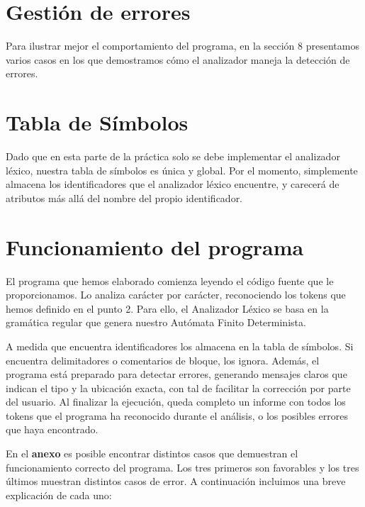 \documentclass{article}
\begin{document}
\section{Gestión de errores}


Para ilustrar mejor el comportamiento del programa, en la sección 8 presentamos varios casos en los que demostramos cómo el analizador maneja la detección de errores.

\section{Tabla de Símbolos}
Dado que en esta parte de la práctica solo se debe implementar el analizador léxico, nuestra tabla de símbolos es única y global. Por el momento, simplemente almacena los identificadores que el analizador léxico encuentre, y carecerá de atributos más allá del nombre del propio identificador.

\section{Funcionamiento del programa}
El programa que hemos elaborado comienza leyendo el código fuente que le proporcionamos. Lo analiza carácter por carácter, reconociendo los tokens que hemos definido en el punto 2. Para ello, el Analizador Léxico se basa en la gramática regular que genera nuestro Autómata Finito Determinista.

A medida que encuentra identificadores los almacena en la tabla de símbolos. Si encuentra delimitadores o comentarios de bloque, los ignora. Además, el programa está preparado para detectar errores, generando mensajes claros que indican el tipo y la ubicación exacta, con tal de facilitar la corrección por parte del usuario. Al finalizar la ejecución, queda completo un informe con todos los tokens que el programa ha reconocido durante el análisis, o los posibles errores que haya encontrado.

En el \textbf{anexo} es posible encontrar distintos casos que demuestran el funcionamiento correcto del programa. Los tres primeros son favorables y los tres últimos muestran distintos casos de error. A continuación incluimos una breve explicación de cada uno:
\end{document}
